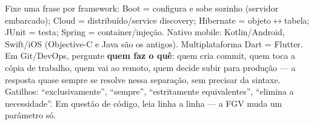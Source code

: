 \begin{comosair}
Fixe uma frase por framework: Boot = configura e sobe sozinho (servidor
embarcado); Cloud = distribuído/service discovery; Hibernate =
objeto$\leftrightarrow$tabela; JUnit = testa; Spring = container/injeção.
Nativo mobile: Kotlin/Android, Swift/iOS (Objective-C e Java são os antigos).
Multiplataforma Dart = Flutter. Em Git/DevOps, pergunte \textbf{quem faz o
quê}: quem cria commit, quem toca a cópia de trabalho, quem vai ao remoto,
quem decide subir para produção --- a resposta quase sempre se resolve nessa
separação, sem precisar da sintaxe. Gatilhos: ``exclusivamente'',
``sempre'', ``estritamente equivalentes'', ``elimina a necessidade''. Em
questão de código, leia linha a linha --- a FGV muda um parâmetro só.
\end{comosair}
